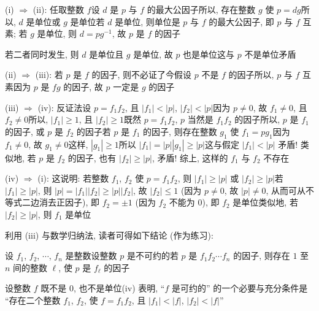 \begin{pf}
    (i) $\Rightarrow$ (ii): 任取整数 $f$\period 设 $d$ 是 $p$ 与 $f$ 的最大公因子\period 所以, 存在整数 $g$ 使 $p = dg$\period 所以, $d$ 是单位或 $g$ 是单位\period 若 $d$ 是单位, 则单位是 $p$ 与 $f$ 的最大公因子, 即 $p$ 与 $f$ 互素; 若 $g$ 是单位, 则 $d = p g^{-1}$, 故 $p$ 是 $f$ 的因子\period

    若二者同时发生, 则 $d$ 是单位且 $g$ 是单位, 故 $p$ 也是单位\period 这与 $p$ 不是单位矛盾\period

    (ii) $\Rightarrow$ (iii): 若 $p$ 是 $f$ 的因子, 则不必证了\period 今假设 $p$ 不是 $f$ 的因子\period 所以, $p$ 与 $f$ 互素\period 因为 $p$ 是 $fg$ 的因子, 故 $p$ 一定是 $g$ 的因子\period

    (iii) $\Rightarrow$ (iv): 反证法\period 设 $p = f_1 f_2$, 且 $|f_1| < |p|$, $|f_2| < |p|$\period 因为 $p \neq 0$, 故 $f_1 \neq 0$, 且 $f_2 \neq 0$\period 所以, $|f_1| \geq 1$, 且 $|f_2| \geq 1$\period 既然 $p = f_1 f_2$, $p$ 当然是 $f_1 f_2$ 的因子\period 所以, $p$ 是 $f_1$ 的因子, 或 $p$ 是 $f_2$ 的因子\period 若 $p$ 是 $f_1$ 的因子, 则存在整数 $g_1$ 使 $f_1 = pg_1$\period 因为 $f_1 \neq 0$, 故 $g_1 \neq 0$\period 这样, $|g_1| \geq 1$\period 所以 $|f_1| = |p| |g_1| \geq |p|$\period 这与假定 $|f_1| < |p|$ 矛盾! 类似地, 若 $p$ 是 $f_2$ 的因子, 也有 $|f_2| \geq |p|$, 矛盾! 综上, 这样的 $f_1$ 与 $f_2$ 不存在\period

    (iv) $\Rightarrow$ (i): 这说明: 若整数 $f_1$, $f_2$ 使 $p = f_1 f_2$, 则 $|f_1| \geq |p|$ 或 $|f_2| \geq |p|$\period 若 $|f_1| \geq |p|$, 则 $|p| = |f_1| |f_2| \geq |p| |f_2|$, 故 $|f_2| \leq 1$ (因为 $p \neq 0$, 故 $|p| \neq 0$, 从而可从不等式二边消去正因子), 即 $f_2 = \pm 1$ (因为 $f_2$ 不能为 $0$), 即 $f_2$ 是单位\period 类似地, 若 $|f_2| \geq |p|$, 则 $f_1$ 是单位\period
\end{pf}

\begin{remark}
    利用 (iii) 与数学归纳法, 读者可得如下结论 (作为练习):

    设 $f_1$, $f_2$, $\cdots$, $f_n$ 是整数\period 设整数 $p$ 是不可约的\period 若 $p$ 是 $f_1 f_2 \cdots f_n$ 的因子, 则存在 $1$ 至 $n$ 间的整数 $\ell$, 使 $p$ 是 $f_{\ell}$ 的因子\period
\end{remark}

\begin{remark}
    设整数 $f$ 既不是 $0$, 也不是单位\period (iv) 表明, ``$f$ 是可约的'' 的一个必要与充分条件是 ``存在二个整数 $f_1$, $f_2$, 使 $f = f_1 f_2$, 且 $|f_1| < |f|$, $|f_2| < |f|$''\period
\end{remark}

